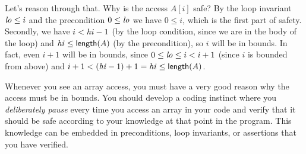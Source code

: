 Let's reason through that.  Why is the access $A[i]$ safe?  By the
loop invariant ${\it lo} \leq i$ and the precondition $0 \leq {\it
  lo}$ we have $0 \leq i$, which is the first part of safety.
%
Secondly, we
have $i < {\it hi}-1$ (by the loop condition, since we are in the body of the
loop) and ${\it hi} \leq \mathsf{length}(A)$ (by the precondition), so $i$ will be
in bounds.  In fact, even $i+1$ will be in bounds, since $0 \leq {\it lo}
\leq i <
i+1$ (since $i$ is bounded from above) and
$i+1 < ({\it hi}-1)+1 = {\it hi} \leq
\mathsf{length}(A)$.

Whenever you see an array access, you must have a very good reason why
the access must be in bounds.  You should develop a coding instinct
where you \emph{deliberately pause} every time you access an array
in your code and verify that it should be safe according to your
knowledge at that point in the program.  This knowledge can be
embedded in preconditions, loop invariants, or assertions that
you have verified.






